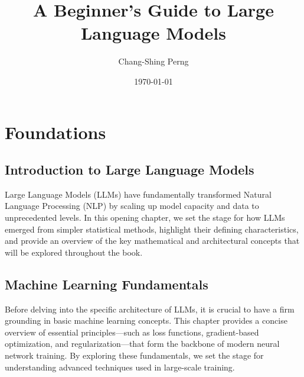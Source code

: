 \documentclass[12pt]{book}
\title{A Beginner's Guide to Large Language Models}
\author{Chang-Shing Perng}
\date{\today}
\let\oldtableofcontents\tableofcontents
\renewcommand{\tableofcontents}{\oldtableofcontents\clearpage}
\begin{document}
\maketitle

\tableofcontents

\part{Foundations}

\chapter{Introduction to Large Language Models}
\noindent
Large Language Models (LLMs) have fundamentally transformed Natural Language Processing (NLP) by scaling up model capacity and data to unprecedented levels. In this opening chapter, we set the stage for how LLMs emerged from simpler statistical methods, highlight their defining characteristics, and provide an overview of the key mathematical and architectural concepts that will be explored throughout the book.






% 
% 
% 


\chapter{Machine Learning Fundamentals}
\noindent
Before delving into the specific architecture of LLMs, it is crucial to have a firm grounding in basic machine learning concepts. This chapter provides a concise overview of essential principles—such as loss functions, gradient-based optimization, and regularization—that form the backbone of modern neural network training. By exploring these fundamentals, we set the stage for understanding advanced techniques used in large-scale training.
\end{document}
